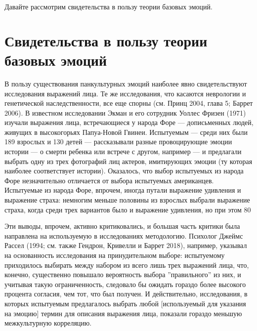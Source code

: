 \documentclass[11pt]{book}
\begin{document}
Давайте рассмотрим свидетельства в пользу теории базовых эмоций.

\section{Свидетельства в пользу теории базовых эмоций}

В пользу существования панкультурных эмоций наиболее явно свидетельствуют исследования выражений лица. Те же исследования, что касаются неврологии и генетической наследственности, все еще спорны (см. Принц 2004, глава 5; Баррет 2006). В известном исследовании Экман и его сотрудник Уоллес Фризен (1971) изучали выражения лица, встречающиеся у народа Форе --- дописьменных людей, живущих в высокогорьях Папуа-Новой Гвинеи. Испытуемым --- среди них были 189 взрослых и 130 детей --- рассказывали разные провоцирующие эмоции истории --- о смерти ребенка или встрече с другом, например --- и предлагали выбрать одну из трех фотографий лиц актеров, имитирующих эмоции (ту которая наиболее соответствует истории). Оказалось, что выбор испытуемых из народа Форе незначительно отличается от выбора испытуемых американцев. Испытуемые из народа Форе, впрочем, иногда путали выражение удивления и выражение страха: немногим меньше половины из взрослых выбрали выражение страха, когда среди трех вариантов было и выражение удивления, но при этом 80%

Эти выводы, впрочем, активно критиковались, и большая часть критики была направлена на используемую в исследованиях методологию. Психолог Джеймс Рассел (1994; см. также Гендрон, Кривелли и Баррет 2018), например, указывал на основанность исследования на принудительном выборе: испытуемому приходилось выбирать между набором из всего лишь трех выражений лица, что, конечно, существенно повышало вероятность выбора ''правильного'' из них, и учитывая такую ограниченность, следовало бы ожидать гораздо более высокого процента согласия, чем тот, что был получен. И действительно, исследования, в которых испытуемым предлагалось выбрать любой [используемый для указания на эмоцию] термин для описания выражения лица, показали гораздо меньшую межкультурную корреляцию.
\end{document}
